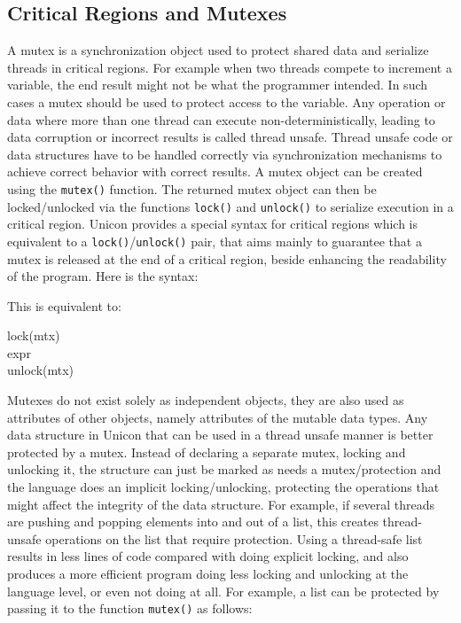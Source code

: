 \subsection{Critical Regions and Mutexes}
A mutex is a synchronization object used to protect shared data and
serialize threads in critical regions. For example when two threads compete
to increment a variable, the end result might not be what the programmer
intended. In such cases a mutex should be used to protect access to the
variable. Any operation or data where more than one thread can execute
non-deterministically, leading to data corruption or incorrect results is
called thread unsafe. Thread unsafe code or data structures have to be
handled correctly via synchronization mechanisms to achieve correct
behavior with correct results.  A mutex object can be created using the
\texttt{mutex()} function. The returned mutex object can then be
locked/unlocked via the functions \texttt{lock()} and \texttt{unlock()} to
serialize execution in a critical region. Unicon provides a special syntax
for critical regions which is equivalent to a
\texttt{lock()}/\texttt{unlock()} pair, that aims mainly to guarantee that
a mutex is released at the end of a critical region, beside enhancing the
readability of the program. Here is the syntax:


\noindent
This is equivalent to:

\begin{iconcode}
lock(mtx)\\
expr\\
unlock(mtx)\\
\end{iconcode}

Mutexes do not exist solely as independent objects, they are also used as
attributes of other objects, namely attributes of the mutable data
types. Any data structure in Unicon that can be used in a thread unsafe
manner is better protected by a mutex. Instead of declaring a separate
mutex, locking and unlocking it, the structure can just be marked as needs
a mutex/protection and the language does an implicit locking/unlocking,
protecting the operations that might affect the integrity of the data
structure.  For example, if several threads are pushing and popping
elements into and out of a list, this creates thread-unsafe operations on
the list that require protection.  Using a thread-safe list results in less
lines of code compared with doing explicit locking, and also produces a
more efficient program doing less locking and unlocking at the language
level, or even not doing at all. For example, a list can be protected by
passing it to the function \texttt{mutex()} as follows:

